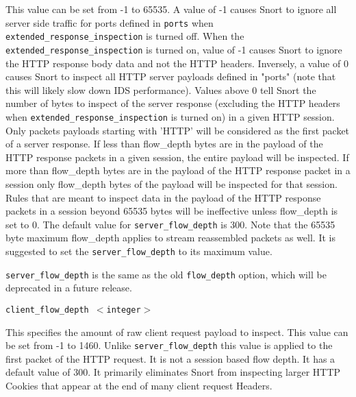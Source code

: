 \documentclass[english]{report}
\newcounter{slistnum}
\newenvironment{slist}
{ \begin{list}{ {\bf \arabic{slistnum}.} }{\usecounter{slistnum} } }
{ \end{list} }
\newenvironment{note}{
\samepage
    \vspace{10pt}{\textsf{
        {\hspace{7pt}\Huge{$\triangle$\hspace{-12.5pt}{\Large{$^!$}}}}\hspace{5pt}
        {\Large{NOTE}}
    }
    }
   \begin{center}
    \par\vspace{-17pt}

    \begin{lrbox}{\savepar}
    \begin{minipage}[r]{6in}
}
{
    \end{minipage}
    \end{lrbox}
    \fbox{
        \usebox{
            \savepar
	}
    }
    \par\vskip10pt
    \end{center}
}
\newenvironment{note}{
        \begin{rawhtml}
        <p><table border="1"><tr><td><b>
        Note:&nbsp;&nbsp;</b>
        \end{rawhtml}
}{
        \begin{rawhtml}
        </b></td></tr></table></p>
        \end{rawhtml}
}
\begin{document}
\begin{slist}
This value can be set from -1 to 65535. A value of -1 causes Snort
to ignore all server side traffic for ports defined in \texttt{ports} when
\texttt{extended\_response\_inspection} is turned off. When the \texttt{extended\_response\_inspection}
 is turned on, value of -1 causes Snort to ignore the HTTP response body data and
 not the HTTP headers.  Inversely, a value of 0 causes Snort to inspect all HTTP server
payloads defined in "ports" (note that this will likely slow down IDS
performance).  Values above 0 tell Snort the number of bytes to
inspect of the server response (excluding the HTTP headers when \texttt{extended\_response\_inspection}
is turned on) in a given HTTP session.  Only packets payloads starting with 'HTTP' will
be considered as the first packet of a server response.  If less than flow\_depth bytes
are in the payload of the HTTP response packets in a given session, the entire payload will be
inspected.  If more than flow\_depth bytes are in the payload of the HTTP response packet in a session
only flow\_depth bytes of the payload will be inspected for that session.  Rules that are meant to
inspect data in the payload of the HTTP response packets in a session beyond 65535 bytes will be
ineffective unless flow\_depth is set to 0. The default value for \texttt{server\_flow\_depth} is 300.
Note that the 65535 byte maximum flow\_depth applies to stream reassembled packets as well. 
It is suggested to set the \texttt{server\_flow\_depth} to its maximum value.

\begin{note}

\texttt{server\_flow\_depth} is the same as the old \texttt{flow\_depth}
option, which will be deprecated in a future release.

\end{note}

\item \texttt{client\_flow\_depth $<$integer$>$}

This specifies the amount of raw client request payload to inspect. This
value can be set from -1 to 1460. Unlike \texttt{server\_flow\_depth} this value is applied
to the first packet of the HTTP request. It is not a session based flow depth.
It has a default value of 300.  It primarily eliminates Snort from inspecting
larger HTTP Cookies that appear at the end of many client request Headers.


\end{slist}
\end{document}
